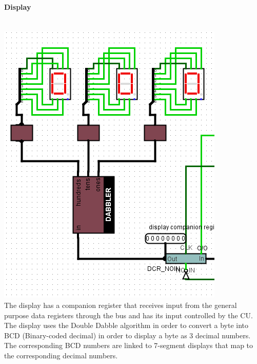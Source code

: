 \documentclass{article}
\begin{document}
	\paragraph{Display}~
	\\\includegraphics[scale=0.5]{DIS}\\The display has a companion register that receives input from the general purpose data registers through the bus and has its input controlled by the CU. The display uses the Double Dabble algorithm in order to convert a byte into BCD (Binary-coded decimal) in order to display a byte as $3$ decimal numbers. The corresponding BCD numbers are linked to 7-segment displays that map to the corresponding decimal numbers.
\end{document}
